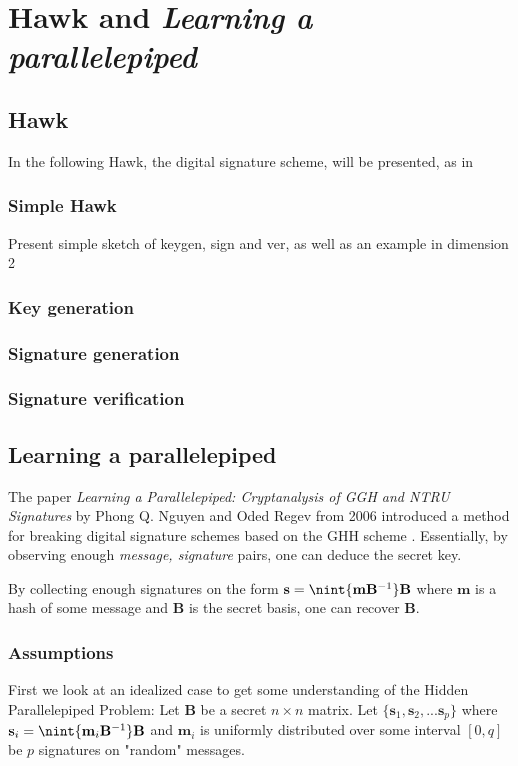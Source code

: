 \chapter{Hawk and \textit{Learning a parallelepiped}}

\section{Hawk}
In the following Hawk, the digital signature scheme, will be presented, as in \cite{hawkspec}
\subsection{Simple Hawk}
Present simple sketch of keygen, sign and ver, as well as an example in dimension 2
\subsection{Key generation}
\subsection{Signature generation}
\subsection{Signature verification}

\section{Learning a parallelepiped}
The paper \textit{Learning a Parallelepiped: Cryptanalysis of GGH and NTRU Signatures} by Phong Q. Nguyen and Oded Regev from 2006 
introduced a method for breaking digital signature schemes based on the GHH scheme \cite{hpp}. 
Essentially, by observing enough \textit{message, signature} pairs, one can deduce the secret key.

By collecting enough signatures on the form $\mathbf{s} = \nint{\textbf{m} \mathbf{B}^{-1}}\mathbf{B}$
where $\mathbf{m}$ is a hash of some message and $\mathbf{B}$ is the secret basis, one can recover $\mathbf{B}$. 
\subsection{Assumptions}
First we look at an idealized case to get some understanding of the Hidden Parallelepiped Problem:
Let $\mathbf{B}$ be a secret $n \times n$ matrix. Let $\{\mathbf{s}_1, \mathbf{s}_2, ... \mathbf{s}_p\}$ where $\mathbf{s}_i = \nint{\textbf{m}_i \mathbf{B}^{-1}}\mathbf{B}$
and $\mathbf{m}_i$ is uniformly distributed over some interval $[0, q]$ be $p$ signatures on "random" messages.
